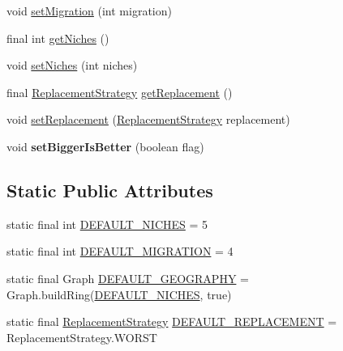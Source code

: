 \begin{CompactItemize}
\item 
void \hyperlink{classjenes_1_1algorithms_1_1_island_g_a_3_01_t_01extends_01_chromosome_01_4_309c1fe9c74c728b2ecab37e91f09322}{setMigration} (int migration)
\item 
final int \hyperlink{classjenes_1_1algorithms_1_1_island_g_a_3_01_t_01extends_01_chromosome_01_4_5642fdd072cd93a61d7ef3f1b5a806ad}{getNiches} ()
\item 
void \hyperlink{classjenes_1_1algorithms_1_1_island_g_a_3_01_t_01extends_01_chromosome_01_4_5ad013b697d423948678c584adde46f7}{setNiches} (int niches)
\item 
final \hyperlink{classjenes_1_1algorithms_1_1_island_g_a_3_01_t_01extends_01_chromosome_01_4_eb0e7c4ddd30e9472cfd2a280544ff51}{ReplacementStrategy} \hyperlink{classjenes_1_1algorithms_1_1_island_g_a_3_01_t_01extends_01_chromosome_01_4_ba40738c3ed2724093a13ec8019d2e11}{getReplacement} ()
\item 
void \hyperlink{classjenes_1_1algorithms_1_1_island_g_a_3_01_t_01extends_01_chromosome_01_4_980d98b95084ac99094dac0d7d231366}{setReplacement} (\hyperlink{classjenes_1_1algorithms_1_1_island_g_a_3_01_t_01extends_01_chromosome_01_4_eb0e7c4ddd30e9472cfd2a280544ff51}{ReplacementStrategy} replacement)
\item 
\hypertarget{classjenes_1_1algorithms_1_1_island_g_a_3_01_t_01extends_01_chromosome_01_4_edb02e8ab567910d449869a8bd778225}{
void \textbf{setBiggerIsBetter} (boolean flag)}
\label{classjenes_1_1algorithms_1_1_island_g_a_3_01_t_01extends_01_chromosome_01_4_edb02e8ab567910d449869a8bd778225}

\end{CompactItemize}
\subsection*{Static Public Attributes}
\begin{CompactItemize}
\item 
static final int \hyperlink{classjenes_1_1algorithms_1_1_island_g_a_3_01_t_01extends_01_chromosome_01_4_37c9c99c1181aa1f194ad610bdb4d25f}{DEFAULT\_\-NICHES} = 5
\item 
static final int \hyperlink{classjenes_1_1algorithms_1_1_island_g_a_3_01_t_01extends_01_chromosome_01_4_114bd755cf3def2fffb318ab4f40569a}{DEFAULT\_\-MIGRATION} = 4
\item 
static final Graph \hyperlink{classjenes_1_1algorithms_1_1_island_g_a_3_01_t_01extends_01_chromosome_01_4_e27b28d3f2b4f90898a4cc90a9bd1bd9}{DEFAULT\_\-GEOGRAPHY} = Graph.buildRing(\hyperlink{classjenes_1_1algorithms_1_1_island_g_a_3_01_t_01extends_01_chromosome_01_4_37c9c99c1181aa1f194ad610bdb4d25f}{DEFAULT\_\-NICHES}, true)
\item 
static final \hyperlink{classjenes_1_1algorithms_1_1_island_g_a_3_01_t_01extends_01_chromosome_01_4_eb0e7c4ddd30e9472cfd2a280544ff51}{ReplacementStrategy} \hyperlink{classjenes_1_1algorithms_1_1_island_g_a_3_01_t_01extends_01_chromosome_01_4_1fc6944fd99215488896c76893d5f3d0}{DEFAULT\_\-REPLACEMENT} = ReplacementStrategy.WORST
\end{CompactItemize}
